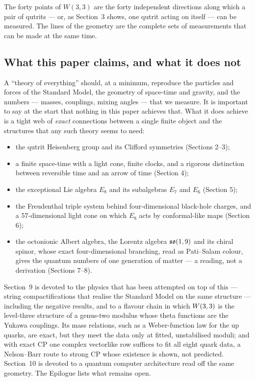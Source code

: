 \begin{keyidea}
The forty points of $W(3,3)$ are the forty independent directions along which a pair
of qutrits --- or, as Section~3 shows, one qutrit acting on itself --- can be measured.
The lines of the geometry are the complete sets of measurements that can be made at the
same time.
\end{keyidea}

\subsection{What this paper claims, and what it does not}

A ``theory of everything'' should, at a minimum, reproduce the particles and forces of
the Standard Model, the geometry of space-time and gravity, and the numbers --- masses,
couplings, mixing angles --- that we measure. It is important to say at the start that
nothing in this paper achieves that. What it does achieve is a tight web of \emph{exact}
connections between a single finite object and the structures that any such theory
seems to need:
\begin{itemize}
\item the qutrit Heisenberg group and its Clifford symmetries (Sections 2--3);
\item a finite space-time with a light cone, finite clocks, and a rigorous distinction
      between reversible time and an arrow of time (Section 4);
\item the exceptional Lie algebra $E_8$ and its subalgebras $E_7$ and $E_6$ (Section 5);
\item the Freudenthal triple system behind four-dimensional black-hole charges, and a
      $57$-dimensional light cone on which $E_8$ acts by conformal-like maps (Section 6);
\item the octonionic Albert algebra, the Lorentz algebra $\mathfrak{so}(1,9)$ and its chiral
      spinor, whose exact four-dimensional branching, read as Pati--Salam colour, gives the
      quantum numbers of one generation of matter --- a reading, not a derivation \tierB
      (Sections 7--8).
\end{itemize}
Section~9 is devoted to the physics that has been attempted on top of this --- string
compactifications that realise the Standard Model on the same structure --- including
the negative results, and to a flavour chain in which $W(3,3)$ is the level-three structure of a
genus-two modulus whose theta functions are the Yukawa couplings. Its mass relations, such as a
Weber-function law for the up quarks, are exact, but they meet the data only at fitted,
unstabilised moduli; and with exact CP one complex vectorlike row suffices to fit all eight
quark data, a Nelson--Barr route to strong CP whose existence is shown, not predicted.
Section~10 is devoted to a quantum computer architecture read off the
same geometry. The Epilogue lists what remains open.

